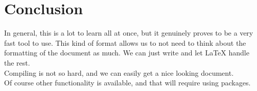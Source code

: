 \documentclass[10pt]{article}
\begin{document}
\section{Conclusion}

In general, this is a lot to learn all at once, but it genuinely proves to be a very fast tool to use.
This kind of format allows us to not need to think about the formatting of the document as much. We can just write and let LaTeX handle the rest.\\
Compiling is not so hard, and we can easily get a nice looking document.\\
Of course other functionality is available, and that will require using packages.
\end{document}
